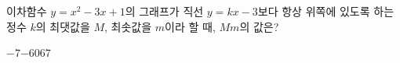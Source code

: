 \hspace*{2mm}\begin{minipage}[t]{\dimexpr\linewidth-2mm\relax}\vspace{0pt}
이차함수 $y=x^2-3x+1$의 그래프가 직선 $y=kx-3$보다 항상 위쪽에 있도록 하는 정수 $k$의 최댓값을 $M$, 최솟값을 $m$이라 할 때, $Mm$의 값은?
\begin{choices32}{$-7$}{$-6$}{$0$}{$6$}{$7$}\end{choices32}\end{minipage}
